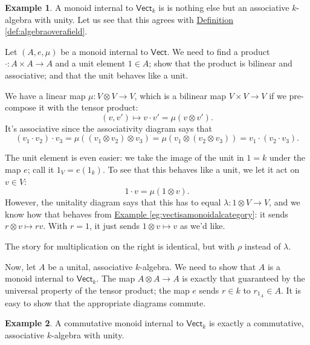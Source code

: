 \documentclass[a4paper]{report}
\theoremstyle{definition}
\newtheorem{example}{Example}[section]
\theoremstyle{plain}
\theoremstyle{remark}
\begin{document}
\begin{example}
  \label{eg:algebrasaremonoidsinternaltovect}
  A monoid internal to $\mathsf{Vect}_{k}$ is is nothing else but an associative $k$-algebra with unity. Let us see that this agrees with \hyperref[def:algebraoverafield]{Definition \ref*{def:algebraoverafield}}.

  Let $(A, e, \mu)$ be a monoid internal to $\mathsf{Vect}$. We need to find a product $\cdot\colon A \times A \to A$ and a unit element $1 \in A$; show that the product is bilinear and associative; and that the unit behaves like a unit.

  We have a linear map $\mu\colon V \otimes V \to V$, which is a bilinear map $V \times V \to V$ if we pre-compose it with the tensor product:
  \begin{equation*}
    (v, v') \mapsto v \cdot v' = \mu(v \otimes v').
  \end{equation*}
  It's associative since the associativity diagram says that
  \begin{equation*}
    (v_{1} \cdot v_{2}) \cdot v_{3} = \mu((v_{1} \otimes v_{2}) \otimes v_{3}) = \mu(v_{1} \otimes (v_{2} \otimes v_{3})) = v_{1} \cdot (v_{2} \cdot v_{3}).
  \end{equation*}

  The unit element is even easier: we take the image of the unit in $1=k$ under the map $e$; call it $1_{V} = e(1_{k})$. To see that this behaves like a unit, we let it act on $v \in V$:
  \begin{equation*}
    1 \cdot v = \mu(1 \otimes v).
  \end{equation*}
  However, the unitality diagram says that this has to equal $\lambda\colon 1 \otimes V \to V$, and we know how that behaves from \hyperref[eg:vectisamonoidalcategory]{Example \ref*{eg:vectisamonoidalcategory}}: it sends $r \otimes v \mapsto rv$. With $r = 1$, it just sends $1 \otimes v \mapsto v$ as we'd like. 

  The story for multiplication on the right is identical, but with $\rho$ instead of $\lambda$.

  Now, let $A$ be a unital, associative $k$-algebra. We need to show that $A$ is a monoid internal to $\mathsf{Vect}_{k}$. The map $A \otimes A \to A$ is exactly that guaranteed by the universal property of the tensor product; the map $e$ sends $r \in k$ to $r_{1_{A}} \in A$. It is easy to show that the appropriate diagrams commute.
\end{example}  

\begin{example}
  A commutative monoid internal to $\mathsf{Vect}_{k}$ is exactly a commutative, associative $k$-algebra with unity.
\end{example}
\end{document}
